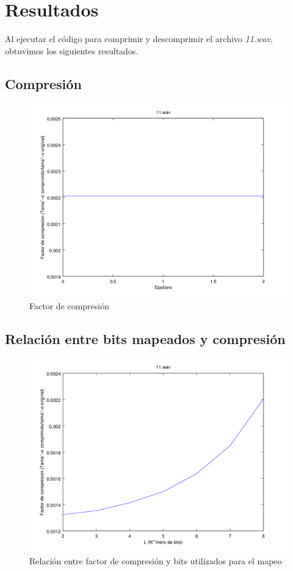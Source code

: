 \documentclass[spanish]{scrartcl}
\begin{document}
\section{Resultados}
Al ejecutar el código para comprimir y descomprimir el archivo \textit{11.wav}, obtuvimos los siguientes resultados.
\subsection{Compresión}

\begin{figure}[!htbp]
    \centering
    \includegraphics[interpolate=false, scale=0.65]{plots/11_epsi_compression}
    \caption{Factor de compresión}
    \label{fig:comp_fact}
\end{figure}

\pagebreak

\subsection{Relación entre bits mapeados y compresión}

\begin{figure}[!htbp]
    \centering
    \includegraphics[interpolate=false, scale=0.65]{plots/11_bits_compression}
    \caption{Relación entre factor de compresión y bits utilizados para el mapeo}
    \label{fig:fact_bits}
\end{figure}
\end{document}
